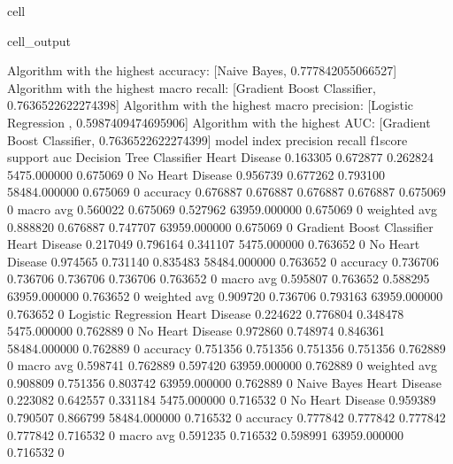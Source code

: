 \documentclass[letterpaper,10pt,english]{jupyterBook}
\begin{document}
\begin{sphinxuseclass}{cell}
\begin{sphinxVerbatimOutput}
\begin{sphinxuseclass}{cell_output}
\begin{sphinxVerbatim}[commandchars=\\\{\}]
Algorithm with the highest accuracy: [\PYGZsq{}Naive Bayes\PYGZsq{}, 0.777842055066527]
Algorithm with the highest macro recall:
        [\PYGZsq{}Gradient Boost Classifier\PYGZsq{}, 0.7636522622274398]
Algorithm with the highest macro precision:
        [\PYGZsq{}Logistic Regression \PYGZsq{}, 0.5987409474695906]
Algorithm with the highest AUC:
        [\PYGZsq{}Gradient Boost Classifier\PYGZsq{}, 0.7636522622274399]
model                      index             precision  recall    f1\PYGZhy{}score  support       auc     
Decision Tree Classifier   Heart Disease     0.163305   0.672877  0.262824  5475.000000   0.675069    0
                           No Heart Disease  0.956739   0.677262  0.793100  58484.000000  0.675069    0
                           accuracy          0.676887   0.676887  0.676887  0.676887      0.675069    0
                           macro avg         0.560022   0.675069  0.527962  63959.000000  0.675069    0
                           weighted avg      0.888820   0.676887  0.747707  63959.000000  0.675069    0
Gradient Boost Classifier  Heart Disease     0.217049   0.796164  0.341107  5475.000000   0.763652    0
                           No Heart Disease  0.974565   0.731140  0.835483  58484.000000  0.763652    0
                           accuracy          0.736706   0.736706  0.736706  0.736706      0.763652    0
                           macro avg         0.595807   0.763652  0.588295  63959.000000  0.763652    0
                           weighted avg      0.909720   0.736706  0.793163  63959.000000  0.763652    0
Logistic Regression        Heart Disease     0.224622   0.776804  0.348478  5475.000000   0.762889    0
                           No Heart Disease  0.972860   0.748974  0.846361  58484.000000  0.762889    0
                           accuracy          0.751356   0.751356  0.751356  0.751356      0.762889    0
                           macro avg         0.598741   0.762889  0.597420  63959.000000  0.762889    0
                           weighted avg      0.908809   0.751356  0.803742  63959.000000  0.762889    0
Naive Bayes                Heart Disease     0.223082   0.642557  0.331184  5475.000000   0.716532    0
                           No Heart Disease  0.959389   0.790507  0.866799  58484.000000  0.716532    0
                           accuracy          0.777842   0.777842  0.777842  0.777842      0.716532    0
                           macro avg         0.591235   0.716532  0.598991  63959.000000  0.716532    0

\end{sphinxVerbatim}
\end{sphinxuseclass}
\end{sphinxVerbatimOutput}
\end{sphinxuseclass}
\end{document}
